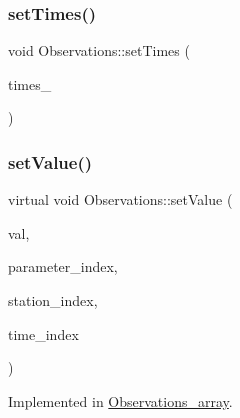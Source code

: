 \mbox{\label{class_observations_a28c65d41c60cb95607e06d090d03a8d2}} 
\subsubsection{\texorpdfstring{set\+Times()}{setTimes()}}
{\footnotesize\ttfamily void Observations\+::set\+Times (\begin{DoxyParamCaption}\item[{\mbox{\hyperlink{classanen_time_1_1_times}{anen\+Time\+::\+Times}}}]{times\+\_\+ }\end{DoxyParamCaption})}

\mbox{\label{class_observations_a6f00b4a2277ce9e77cd0d5975f4066f8}} 
\subsubsection{\texorpdfstring{set\+Value()}{setValue()}\hspace{0.1cm}{\footnotesize\ttfamily [1/2]}}
{\footnotesize\ttfamily virtual void Observations\+::set\+Value (\begin{DoxyParamCaption}\item[{double}]{val,  }\item[{std\+::size\+\_\+t}]{parameter\+\_\+index,  }\item[{std\+::size\+\_\+t}]{station\+\_\+index,  }\item[{std\+::size\+\_\+t}]{time\+\_\+index }\end{DoxyParamCaption})\hspace{0.3cm}{\ttfamily [pure virtual]}}



Implemented in \mbox{\hyperlink{class_observations__array_aa6b6e042f8db0afad3beaff248b4a602}{Observations\+\_\+array}}.

\mbox{\label{class_observations_a6ec8166ad0f141e23a07847ab3646a61}} 
